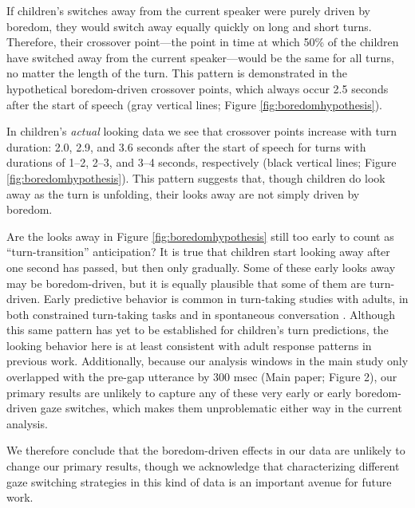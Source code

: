 \documentclass[authoryear, 12pt]{elsarticle}
\begin{document}
If children's switches away from the current speaker were purely driven by boredom, they would switch away equally quickly on long and short turns. Therefore, their crossover point---the point in time at which 50\% of the children have switched away from the current speaker---would be the same for all turns, no matter the length of the turn. This pattern is demonstrated in the hypothetical boredom-driven crossover points, which always occur 2.5 seconds after the start of speech (gray vertical lines; Figure \ref{fig:boredomhypothesis}).

In children's \textit{actual} looking data we see that crossover points increase with turn duration: 2.0, 2.9, and 3.6 seconds after the start of speech for turns with durations of 1--2, 2--3, and 3--4 seconds, respectively (black vertical lines; Figure \ref{fig:boredomhypothesis}). This pattern suggests that, though children do look away as the turn is unfolding, their looks away are not simply driven by boredom.

Are the looks away in Figure \ref{fig:boredomhypothesis} still too early to count as ``turn-transition'' anticipation? It is true that children start looking away after one second has passed, but then only gradually. Some of these early looks away may be boredom-driven, but it is equally plausible that some of them are turn-driven. Early predictive behavior is common in turn-taking studies with adults, in both constrained turn-taking tasks \citep{de-ruiter2006, gisladottir2015, bogelstorreira2015} and in spontaneous conversation \citep{holler2015, bogels2015}. Although this same pattern has yet to be established for children's turn predictions, the looking behavior here is at least consistent with adult response patterns in previous work. Additionally, because our analysis windows in the main study only overlapped with the pre-gap utterance by 300 msec (Main paper; Figure 2), our primary results are unlikely to capture any of these very early or early boredom-driven gaze switches, which makes them unproblematic either way in the current analysis.

We therefore conclude that the boredom-driven effects in our data are unlikely to change our primary results, though we acknowledge that characterizing different gaze switching strategies in this kind of data is an important avenue for future work.

\clearpage
\end{document}

